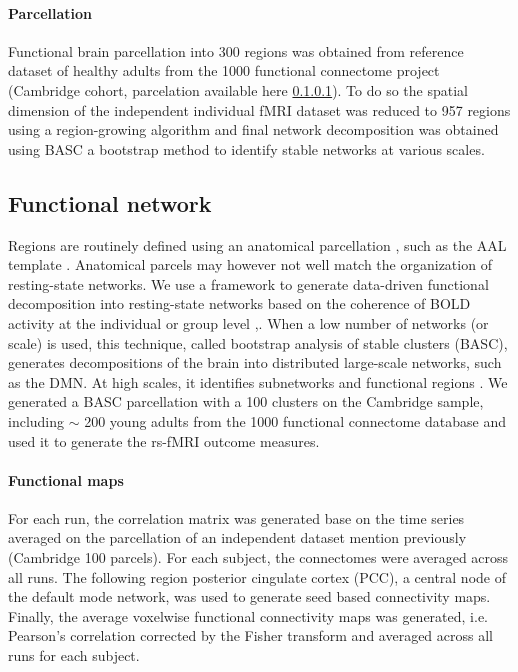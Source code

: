 \documentclass[authoryear]{elsarticle}
\begin{document}
\paragraph{Parcellation}
Functional brain parcellation into 300 regions was obtained from reference dataset of healthy adults from the 1000 functional connectome project (Cambridge cohort, parcelation available here \ref{}). To do so the spatial dimension of the independent individual fMRI dataset was reduced to 957 regions using a region-growing algorithm \cite{Bellec2006} and final network decomposition was obtained using BASC \cite{Bellec2010c} a bootstrap method to identify stable networks at various scales.

\subsection{Functional network}
Regions are routinely defined using an anatomical parcellation \citep{He2009}, such as the AAL template \citep{Tzourio-Mazoyer2002}. Anatomical parcels may however not well match the organization of resting-state networks. We use a framework to generate data-driven functional decomposition into resting-state networks based on the coherence of BOLD activity at the individual or group level \citep{Bellec2006},\citep{Bellec2010c}. When a low number of networks (or scale) is used, this technique, called bootstrap analysis of stable clusters (BASC), generates decompositions of the brain into distributed large-scale networks, such as the DMN. At high scales, it identifies subnetworks and functional regions \citep{Kelly2012}. We generated a BASC parcellation with a 100 clusters on the Cambridge sample, including $\sim$ 200 young adults from the 1000 functional connectome database \citep{Biswal2010} and used it to generate the rs-fMRI outcome measures.

\paragraph{Functional maps}
For each run, the correlation matrix was generated base on the time series averaged on the parcellation of an independent dataset mention previously (Cambridge 100 parcels). For each subject, the connectomes were averaged across all runs. The following region posterior cingulate cortex (PCC), a central node of the default mode network, was used to generate seed based connectivity maps. Finally, the average voxelwise functional connectivity maps was generated, i.e. Pearson's correlation corrected by the Fisher transform and averaged across all runs for each subject.
\end{document}
